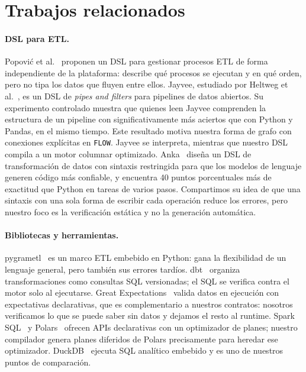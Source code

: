 \documentclass[sigplan,screen,nonacm]{acmart}
\begin{document}
\section{Trabajos relacionados}

\paragraph{DSL para ETL.}
Popović et al.~\cite{popovic2024} proponen un DSL para gestionar procesos ETL de forma
independiente de la plataforma: describe qué procesos se ejecutan y en qué orden, pero no
tipa los datos que fluyen entre ellos. Jayvee, estudiado por Heltweg et al.~\cite{heltweg2025},
es un DSL de \emph{pipes and filters} para pipelines de datos abiertos. Su experimento
controlado muestra que quienes leen Jayvee comprenden la estructura de un pipeline con
significativamente más aciertos que con Python y Pandas, en el mismo tiempo. Este resultado
motiva nuestra forma de grafo con conexiones explícitas en \texttt{FLOW}. Jayvee se
interpreta, mientras que nuestro DSL compila a un motor columnar optimizado. Anka~\cite{mazrouei2025}
diseña un DSL de transformación de datos con sintaxis restringida para que los modelos de
lenguaje generen código más confiable, y encuentra 40 puntos porcentuales más de exactitud
que Python en tareas de varios pasos. Compartimos su idea de que una sintaxis con una sola
forma de escribir cada operación reduce los errores, pero nuestro foco es la verificación
estática y no la generación automática.

\paragraph{Bibliotecas y herramientas.}
pygrametl~\cite{thomsen2009} es un marco ETL embebido en Python: gana la flexibilidad de un
lenguaje general, pero también sus errores tardíos. dbt~\cite{dbt} organiza transformaciones
como consultas SQL versionadas; el SQL se verifica contra el motor solo al ejecutarse. Great
Expectations~\cite{greatexpectations} valida datos en ejecución con expectativas
declarativas, que es complementario a nuestros contratos: nosotros verificamos lo que se
puede saber sin datos y dejamos el resto al runtime. Spark SQL~\cite{armbrust2015} y
Polars~\cite{polars} ofrecen APIs declarativas con un optimizador de planes; nuestro
compilador genera planes diferidos de Polars precisamente para heredar ese optimizador.
DuckDB~\cite{raasveldt2019} ejecuta SQL analítico embebido y es uno de nuestros puntos de
comparación.
\end{document}

